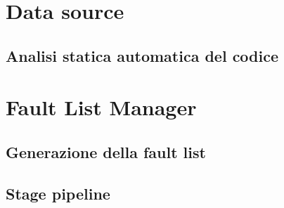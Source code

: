 \newpage
\section{Data source}
\subsection{Analisi statica automatica del codice}

\section{Fault List Manager}\label{sec:FLM}

\subsection{Generazione della fault list}

\subsection{Stage pipeline}